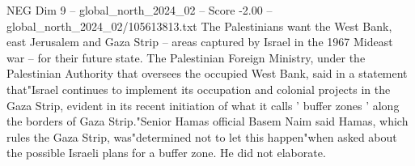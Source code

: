 \begin{textsample}{NEG Dim 9 – global\_north\_2024\_02 – Score -2.00 – global\_north\_2024\_02/105613813.txt}
The Palestinians want the West Bank, east Jerusalem and Gaza Strip -- areas captured by Israel in the 1967 Mideast war -- for their future state.
The Palestinian Foreign Ministry, under the Palestinian Authority that oversees the occupied West Bank, said in a statement that"Israel continues to implement its occupation and colonial projects in the Gaza Strip, evident in its recent initiation of what it calls ' buffer zones ' along the borders of Gaza Strip."Senior Hamas official Basem Naim said Hamas, which rules the Gaza Strip, was"determined not to let this happen"when asked about the possible Israeli plans for a buffer zone.
He did not elaborate.

\end{textsample}
